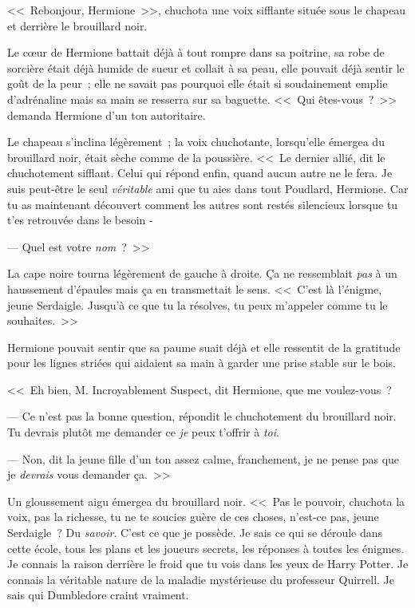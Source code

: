 <<~Rebonjour, Hermione~>>, chuchota une voix sifflante située sous le chapeau et derrière le brouillard noir.

Le cœur de Hermione battait déjà à tout rompre dans sa poitrine, sa robe de sorcière était déjà humide de sueur et collait à sa peau, elle pouvait déjà sentir le goût de la peur~; elle ne savait pas pourquoi elle était si soudainement emplie d'adrénaline mais sa main se resserra sur sa baguette. <<~Qui êtes-vous~?~>> demanda Hermione d'un ton autoritaire.

Le chapeau s'inclina légèrement~; la voix chuchotante, lorsqu'elle émergea du brouillard noir, était sèche comme de la poussière. <<~Le dernier allié, dit le chuchotement sifflant. Celui qui répond enfin, quand aucun autre ne le fera. Je suis peut-être le seul \emph{véritable} ami que tu aies dans tout Poudlard, Hermione. Car tu as maintenant découvert comment les autres sont restés silencieux lorsque tu t'es retrouvée dans le besoin -

--- Quel est votre \emph{nom}~?~>>

La cape noire tourna légèrement de gauche à droite. Ça ne ressemblait \emph{pas} à un haussement d'épaules mais ça en transmettait le sens. <<~C'est là l'énigme, jeune Serdaigle. Jusqu'à ce que tu la résolves, tu peux m'appeler comme tu le souhaites.~>>

Hermione pouvait sentir que sa paume suait déjà et elle ressentit de la gratitude pour les lignes striées qui aidaient sa main à garder une prise stable sur le bois.

<<~Eh bien, M. Incroyablement Suspect, dit Hermione, que me voulez-vous~?

--- Ce n'est pas la bonne question, répondit le chuchotement du brouillard noir. Tu devrais plutôt me demander ce \emph{je} peux t'offrir à \emph{toi}.

--- Non, dit la jeune fille d'un ton assez calme, franchement, je ne pense pas que je \emph{devrais} vous demander ça.~>>

Un gloussement aigu émergea du brouillard noir. <<~Pas le pouvoir, chuchota la voix, pas la richesse, tu ne te soucies guère de ces choses, n'est-ce pas, jeune Serdaigle~? Du \emph{savoir}. C'est ce que je possède. Je sais ce qui se déroule dans cette école, tous les plans et les joueurs secrets, les réponses à toutes les énigmes. Je connais la raison derrière le froid que tu vois dans les yeux de Harry Potter. Je connais la véritable nature de la maladie mystérieuse du professeur Quirrell. Je sais qui Dumbledore craint vraiment.

